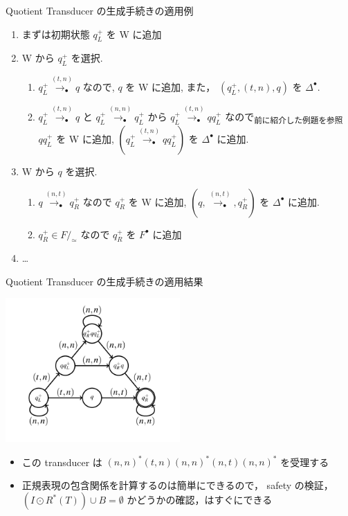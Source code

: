 \documentclass[presentation, xetex]{beamer}
\begin{document}
\begin{frame}[label={sec:org16324ba}]{Quotient Transducer の生成手続きの適用例}
\begin{enumerate}
\item まずは初期状態 \(q_L^+\) を W に追加
\item W から \(q_L^+\) を選択.
\begin{enumerate}
\item \(q_L^+ \overset{(t,n)}{\longrightarrow_\bullet} q\) なので,
\(q\) を W に追加,
また， \((q_L^+, (t, n), q)\) を \(\Delta^\bullet\).
\item \(q_L^+ \overset{(t, n)}{\longrightarrow_\bullet} q\) と
\(q_L^+ \overset{(n,n)}{\longrightarrow_\bullet} q_L^+\)
から
\(q_L^+ \overset{(t, n)}{\longrightarrow_\bullet} q q_L^+\) なので\textsubscript{前に紹介した例題を参照}\\
\(q q_L^+\) を W に追加,
\((q_L^+ \overset{(t, n)}{\longrightarrow_\bullet} q q_L^+)\) を \(\Delta^\bullet\) に追加.
\end{enumerate}
\item W から \(q\) を選択.
\begin{enumerate}
\item \(q \overset{(n,t)}{\longrightarrow_\bullet} q_R^+\) なので
\(q_R^+\) を W に追加,
\((q, \overset{(n, t)}{\longrightarrow_\bullet}, q_R^+)\)
を \(\Delta^\bullet\) に追加.
\item \(q_R^+ \in F/_\simeq\) なので \(q_R^+\) を \(F^\bullet\) に追加
\end{enumerate}
\item \ldots{}
\end{enumerate}
\end{frame}


\begin{frame}[label={sec:orgf0d908c}]{Quotient Transducer の生成手続きの適用結果}
\begin{center}
\includegraphics[width=0.5\textwidth]{./images/quoting-rmc-result.png}
\end{center}

\begin{itemize}
\item この transducer は \((n, n)^* (t, n) (n, n)^* (n, t) (n, n)^*\) を受理する
\item 正規表現の包含関係を計算するのは簡単にできるので，
safety の検証， \((I \odot R^*(T)) \cup B = \emptyset\) かどうかの確認，はすぐにできる
\end{itemize}
\end{frame}
\end{document}
